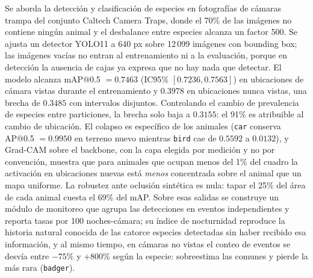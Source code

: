 Se aborda la detección y clasificación de especies en fotografías de cámaras
trampa del conjunto Caltech Camera Traps, donde el 70\% de las imágenes no
contiene ningún animal y el desbalance entre especies alcanza un factor 500. Se
ajusta un detector YOLO11 a 640 px sobre 12\,099 imágenes con bounding box; las
imágenes vacías no entran al entrenamiento ni a la evaluación, porque en
detección la ausencia de cajas ya expresa que no hay nada que detectar.
El modelo alcanza mAP@0.5 $= 0.7463$ (IC95\% $[0.7236, 0.7563]$) en ubicaciones
de cámara vistas durante el entrenamiento y $0.3978$ en ubicaciones nunca
vistas, una brecha de $0.3485$ con intervalos disjuntos. Controlando el cambio
de prevalencia de especies entre particiones, la brecha solo baja a $0.3155$: el
91\% es atribuible al cambio de ubicación. El colapso es específico de los
animales (\texttt{car} conserva AP@0.5 $= 0.9950$ en terreno nuevo mientras
\texttt{bird} cae de $0.5592$ a $0.0132$), y Grad-CAM sobre el backbone, con la
capa elegida por medición y no por convención, muestra que para animales que
ocupan menos del 1\% del cuadro la activación en ubicaciones nuevas está
\emph{menos} concentrada sobre el animal que un mapa uniforme. La robustez ante
oclusión sintética es nula: tapar el 25\% del área de cada animal cuesta el 69\%
del mAP. Sobre esas salidas se construye un módulo de monitoreo que agrupa las
detecciones en eventos independientes y reporta tasas por 100 noches-cámara; su
índice de nocturnidad reproduce la historia natural conocida de las catorce
especies detectadas sin haber recibido esa información, y al mismo tiempo, en
cámaras no vistas el conteo de eventos se desvía entre $-75\%$ y $+800\%$ según
la especie: sobreestima las comunes y pierde la más rara (\texttt{badger}).
